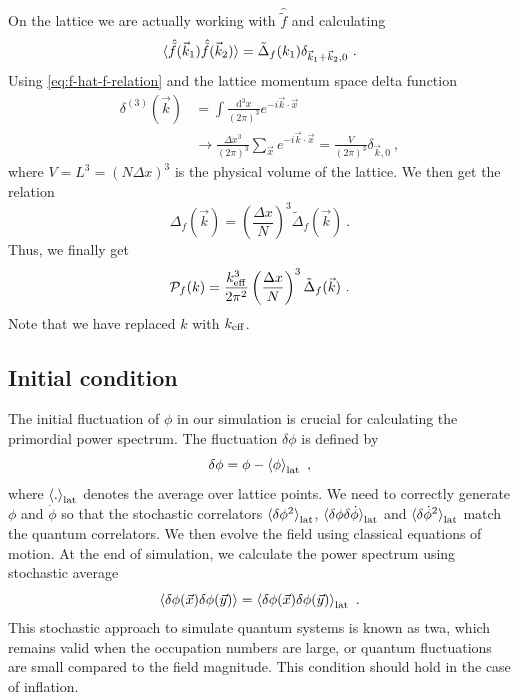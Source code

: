 \documentclass[reprint, 10pt, amsmath, amssymb, floatfix, aps, prd, superscriptaddress, nofootinbib, nobibnotes,twocolumn]{revtex4-1}
\def\dd{{\mathrm{d}}}
\begin{document}
On the lattice we are actually working with $\hat{\tilde f}$ and calculating
\begin{equation}
	\braket{\hat{\tilde f}(\vec k_1)\hat{\tilde f}(\vec k_2)} = \tilde\Delta_f(k_1)\delta_{\vec k_1 + \vec k_2, 0} \ .
\end{equation}
Using \eqref{eq:f-hat-f-relation} and the lattice momentum space delta function
\begin{align}
	\delta^{(3)}(\vec k) & = \int\frac{\dd^3x}{(2\pi)^3}e^{-i\vec k\cdot\vec x}\\
	& \to \frac{\Delta x^3}{(2\pi)^3}\sum_{\vec x} e^{-i\vec k\cdot\vec x} = \frac{V}{(2\pi)^3}\delta_{\vec k, 0} \ ,
\end{align}
where $V = L^3 = (N\Delta x)^3$ is the physical volume of the lattice. We then get the relation
\begin{equation}
	\Delta_f(\vec k) = \left(\frac{\Delta x}{N}\right)^3\tilde\Delta_f(\vec k) \ .
\end{equation}
Thus, we finally get
\begin{equation}\label{eq:lat-spectrum-relation}
	\mathcal P_f(k) = \frac{k_{\rm eff}^3}{2\pi^2}\left(\frac{\Delta x}{N}\right)^3\tilde\Delta_f(\vec k) \ .
\end{equation}
Note that we have replaced $k$ with $k_{\rm eff}$.

\subsection{Initial condition}
The initial fluctuation of $\phi$ in our simulation is crucial for calculating the primordial power spectrum. The fluctuation $\delta\phi$ is defined by
\begin{equation}
	\delta\phi = \phi - \braket{\phi}_{\rm lat} \ ,
\end{equation}
where $\braket{.}_{\rm lat}$ denotes the average over lattice points. We need to correctly generate $\phi$ and $\dot\phi$ so that the stochastic correlators $\braket{\delta\phi^2}_{\rm lat}$, $\braket{\delta\phi\delta\dot\phi}_{\rm lat}$ and $\braket{\delta\dot\phi^2}_{\rm lat}$ match the quantum correlators. We then evolve the field using classical equations of motion. At the end of simulation, we calculate the power spectrum using stochastic average
\begin{equation}
	\braket{\delta\phi(\vec x)\delta\phi(\vec y)} = \braket{\delta\phi(\vec x)\delta\phi(\vec y)}_{\rm lat} \ .
\end{equation}
This stochastic approach to simulate quantum systems is known as \ac{twa}, which remains valid when the occupation numbers are large, or quantum fluctuations are small compared to the field magnitude. This condition should hold in the case of inflation.
\end{document}
